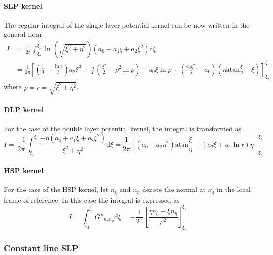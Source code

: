 \documentclass[a4paper,11pt]{article}
\newcommand{\td}{\mathrm{d}}
\newcommand{\atan}{\mathrm{atan}}
\begin{document}
\paragraph{SLP kernel}

The regular integral of the single layer potential kernel can be now written in the general form
%
\begin{align}
I &= \frac{-1}{2\pi} \int_{\xi_2}^{\xi_1} \ln\left(\sqrt{\xi^2+\eta^2}\right) \left(a_0 + a_1 \xi + a_2 \xi^2\right) \td \xi \\
 &= \frac{1}{2\pi} \left[
\left(\frac{1}{9} - \frac{\ln \rho}{3}\right) a_2 \xi^3
+ \frac{a_1}{2} \left(\frac{\xi^2}{2}
- \rho^2 \ln \rho\right)
- a_0 \xi \ln \rho
+ \left(\frac{a_2 \eta^2}{3} - a_0 \right) \left(\eta \atan\frac{\xi}{\eta} - \xi\right)
\right]_{\xi_2}^{\xi_1} \nonumber
\end{align}
%
where $\rho = r = \sqrt{\xi^2+\eta^2}$.

\paragraph{DLP kernel}

For the case of the double layer potential kernel, the integral is transformed as
%
\begin{equation}
I = \frac{-1}{2\pi} \int_{\xi_2}^{\xi_1} \frac{-\eta \left(a_0 + a_1 \xi + a_2 \xi^2 \right)}{\xi^2+\eta^2}\td \xi
= \frac{1}{2\pi} \left[
\left( a_0 - a_2 \eta^2\right) \atan \frac{\xi}{\eta} + \left(a_2 \xi + a_1 \ln r\right) \eta
\right]_{\xi_2}^{\xi_1}
\end{equation}

\paragraph{HSP kernel}

For the case of the HSP kernel, let $n_{\xi}$ and $n_{\eta}$ denote the normal at $x_0$ in the local frame of reference. In this case the integral is expressed as
%
\begin{equation}
I
= \int_{\xi_2}^{\xi_1} G''_{n_x n_y} \td \xi
= -\frac{1}{2\pi} \left[ \frac{ \eta n_{\xi} + \xi n_{\eta} }{\rho^2} \right]_{\xi_2}^{\xi_1}
\end{equation}

\subsubsection{Constant line SLP}
\end{document}
